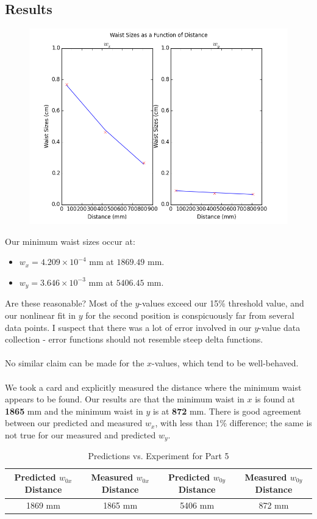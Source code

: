 \documentclass[10pt,a4paper]{article}
\begin{document}
\subsection*{Results}
\begin{figure}[H]
\centering
\includegraphics[width = \textwidth]{../Analysis/figure_4.png} 
\end{figure}
Our minimum waist sizes occur at:
\begin{itemize}
\item $w_{x} = 4.209\times 10^{-4}$ mm at $1869.49$ mm.
\item $w_{y} = 3.646\times 10^{-3}$ mm at $5406.45$ mm.
\end{itemize}
Are these reasonable? Most of the $y$-values exceed our 15\% threshold value, and our nonlinear  fit in $y$ for the second position is conspicuously far from several data points. I suspect that there was a lot of error involved in our $y$-value data collection - error functions should not resemble steep delta functions.\\
\\
No similar claim can be made for the $x$-values, which tend to be well-behaved.\\
\\
We took a card and explicitly measured the distance where the minimum waist appears to be found. Our results are that the minimum waist in $x$ is found at \textbf{1865} mm and the minimum waist in $y$ is at \textbf{872} mm. There is good agreement between our predicted and measured $w_{x}$, with less than 1\% difference; the same is not true for our measured and predicted $w_{y}$.
\begin{table}
\centering
\begin{tabular}{cccc}
\hline 
Predicted $w_{0x}$ Distance & Measured $w_{0x}$ Distance & Predicted $w_{0y}$ Distance & Measured $w_{0y}$ Distance \\ 
\hline 
1869 mm & 1865 mm & 5406 mm & 872 mm \\ 
\hline 
\end{tabular}
\caption{Predictions vs. Experiment for Part 5} 
\end{table}
\end{document}
